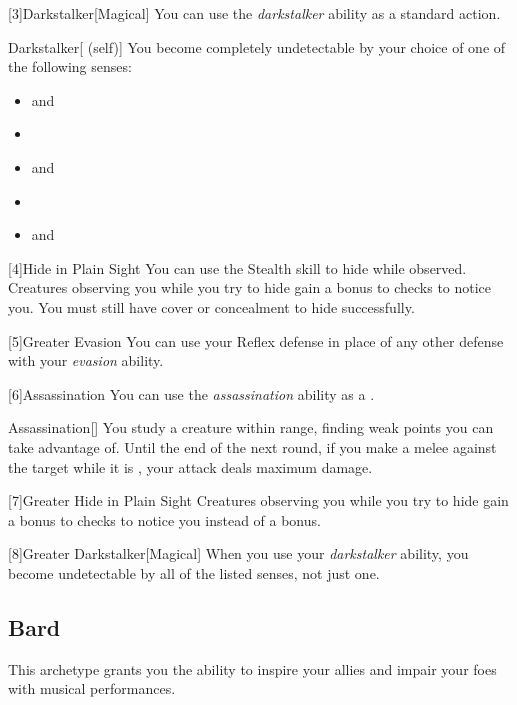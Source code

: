         [3]{Darkstalker}[Magical] You can use the \textit{darkstalker} ability as a standard action.
        \begin{attuneability}{Darkstalker}[ (self)]
            You become completely undetectable by your choice of one of the following senses:
            \begin{itemize}
                \item {} and 
                \item {}
                \item {} and 
                \item {}
                \item {} and 
            \end{itemize}
        \end{attuneability}

        [4]{Hide in Plain Sight} You can use the Stealth skill to hide while observed.
        Creatures observing you while you try to hide gain a  bonus to checks to notice you.
        You must still have cover or concealment to hide successfully.

        [5]{Greater Evasion} You can use your Reflex defense in place of any other defense with your \textit{evasion} ability.

        [6]{Assassination} You can use the \textit{assassination} ability as a .
        \begin{freeability}{Assassination}[]
            You study a creature within \rngmed range, finding weak points you can take advantage of.
            Until the end of the next round, if you make a melee  against the target while it is \unaware, your attack deals maximum damage.
        \end{freeability}

        [7]{Greater Hide in Plain Sight} Creatures observing you while you try to hide gain a  bonus to checks to notice you instead of a  bonus.

        [8]{Greater Darkstalker}[Magical] When you use your \textit{darkstalker} ability, you become undetectable by all of the listed senses, not just one.

    \subsection{Bard}
        This archetype grants you the ability to inspire your allies and impair your foes with musical performances.

